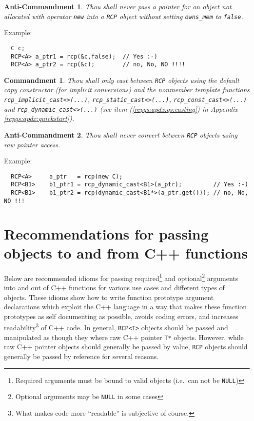 \documentclass[pdf,ps2pdf,11pt]{SANDreport}
\newtheorem{commandment}{Commandment}
\newtheorem{anticommandment}{Anti-Commandment}
\begin{document}
\begin{anticommandment}
Thou shall never pass a pointer for an object {}\underline{not}
allocated with operator {}\texttt{new} into a
{}\texttt{RCP} object without setting
{}\texttt{owns\_mem} to {}\texttt{false}.
\end{anticommandment}

{}\noindent{}Example:
{\small\begin{verbatim}
  C c;
  RCP<A> a_ptr1 = rcp(&c,false);  // Yes :-)
  RCP<A> a_ptr2 = rcp(&c);        // no, No, NO !!!!
\end{verbatim}}

\begin{commandment}\label{rcp:cmnd:converstion}
Thou shall only cast between {}\texttt{RCP} objects
using the default copy constructor (for implicit conversions) and the
nonmember template functions {}\texttt{rcp\-\_implicit\-\_cast<>(\-...)},
{}\texttt{rcp\-\_static\-\_cast<>(\-...)},
{}\texttt{rcp\-\_const\-\_cast<>(\-...)} and
{}\texttt{rcp\-\_dynamic\-\_cast<>(\-...)}  (see item
({}\ref{rcpqs:apdx:qs:casting}) in Appendix
{}\ref{rcpqs:apdx:quickstart}).
\end{commandment}

\begin{anticommandment}
Thou shall never convert between {}\texttt{RCP} objects
using raw pointer access.
\end{anticommandment}

{}\noindent{}Example:
{\small\begin{verbatim}
  RCP<A>     a_ptr   = rcp(new C);
  RCP<B1>    b1_ptr1 = rcp_dynamic_cast<B1>(a_ptr);         // Yes :-)
  RCP<B1>    b1_ptr2 = rcp(dynamic_cast<B1*>(a_ptr.get())); // no, No, NO !!!
\end{verbatim}}

%
\section{Recommendations for passing objects to and from C++ functions}
\label{rcpqs:apdx:passing-args}
%

Below are recommended idioms for passing required\footnote{Required arguments
must be bound to valid objects (i.e.~can not be {}\texttt{NULL})} and
optional\footnote{Optional arguments may be {}\texttt{NULL} in some cases}
arguments into and out of C++ functions for various use cases and different
types of objects.  These idioms show how to write function prototype argument
declarations which exploit the C++ language in a way that makes these function
prototypes as self documenting as possible, avoids coding errors, and
increases readability\footnote{What makes code more ``readable'' is subjective
of course.} of C++ code.  In general, {}\texttt{RCP<T>} objects should be
passed and manipulated as though they where raw C++ pointer {}\texttt{T*}
objects.  However, while raw C++ pointer objects should generally be passed by
value, {}\texttt{RCP} objects should generally be passed by reference for
several reasons.
\end{document}
